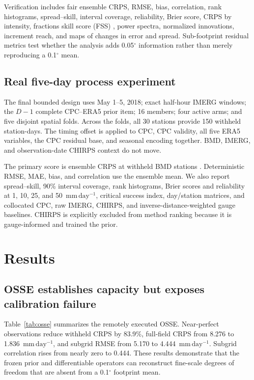 \documentclass[10pt,twocolumn]{article}
\newcommand{\mmday}{\mathrm{mm\,day^{-1}}}
\begin{document}
Verification includes fair ensemble CRPS, RMSE, bias, correlation, rank histograms, spread--skill, interval coverage, reliability, Brier score, CRPS by intensity, fractions skill score (FSS) \cite{roberts2008}, power spectra, normalized innovations, increment reach, and maps of changes in error and spread. Sub-footprint residual metrics test whether the analysis adds 0.05$^\circ$ information rather than merely reproducing a 0.1$^\circ$ mean.

\subsection{Real five-day process experiment}

The final bounded design uses May 1--5, 2018; exact half-hour IMERG windows; the $D-1$ complete CPC--ERA5 prior item; 16 members; four active arms; and five disjoint spatial folds. Across the folds, all 30 stations provide 150 withheld station-days. The timing offset is applied to CPC, CPC validity, all five ERA5 variables, the CPC residual base, and seasonal encoding together. BMD, IMERG, and observation-date CHIRPS context do not move.

The primary score is ensemble CRPS at withheld BMD stations \cite{gneiting2007}. Deterministic RMSE, MAE, bias, and correlation use the ensemble mean. We also report spread--skill, 90\% interval coverage, rank histograms, Brier scores and reliability at 1, 10, 25, and 50~$\mmday$, critical success index, day/station matrices, and collocated CPC, raw IMERG, CHIRPS, and inverse-distance-weighted gauge baselines. CHIRPS is explicitly excluded from method ranking because it is gauge-informed and trained the prior.

\section{Results}

\subsection{OSSE establishes capacity but exposes calibration failure}

Table~\ref{tab:osse} summarizes the remotely executed OSSE. Near-perfect observations reduce withheld CRPS by 83.9\%, full-field CRPS from 8.276 to 1.836~$\mmday$, and subgrid RMSE from 5.170 to 4.444~$\mmday$. Subgrid correlation rises from nearly zero to 0.444. These results demonstrate that the frozen prior and differentiable operators can reconstruct fine-scale degrees of freedom that are absent from a 0.1$^\circ$ footprint mean.
\end{document}
